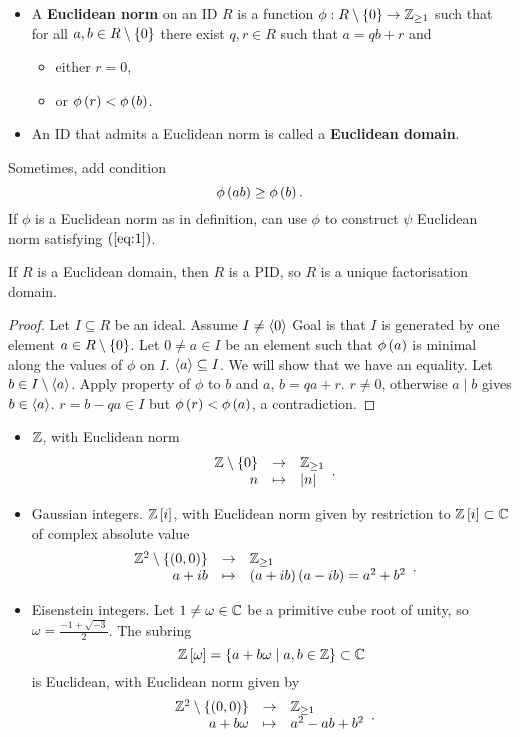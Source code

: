 \begin{definition}
\hfill
\begin{itemize}
\item A \textbf{Euclidean norm} on an ID $ R $ is a function $ \phi : R \setminus \left\{ 0 \right\} \to \mathbb{Z}_{\ge 1} $ such that for all $ a, b \in R \setminus \left\{ 0 \right\} $ there exist $ q, r \in R $ such that $ a = qb + r $ and
\begin{itemize}
\item either $ r = 0 $,
\item or $ \phi\left( r \right) < \phi\left( b \right) $.
\end{itemize}
\item An ID that admits a Euclidean norm is called a \textbf{Euclidean domain}.
\end{itemize}
\end{definition}

Sometimes, add condition
\begin{equation}
\label{eq:1}
\phi\left( ab \right) \ge \phi\left( b \right).
\end{equation}
If $ \phi $ is a Euclidean norm as in definition, can use $ \phi $ to construct $ \psi $ Euclidean norm satisfying $ \left( \ref{eq:1} \right) $.

\begin{theorem}
If $ R $ is a Euclidean domain, then $ R $ is a PID, so $ R $ is a unique factorisation domain.
\end{theorem}


\begin{proof}
Let $ I \subseteq R $ be an ideal. Assume $ I \ne \left\langle 0 \right\rangle $ Goal is that $ I $ is generated by one element $ a \in R \setminus \left\{ 0 \right\} $. Let $ 0 \ne a \in I $ be an element such that $ \phi\left( a \right) $ is minimal along the values of $ \phi $ on $ I $. $ \left\langle a \right\rangle \subseteq I $. We will show that we have an equality. Let $ b \in I \setminus \left\langle a \right\rangle $. Apply property of $ \phi $ to $ b $ and $ a $, $ b = qa + r $. $ r \ne 0 $, otherwise $ a \mid b $ gives $ b \in \left\langle a \right\rangle $. $ r = b - qa \in I $ but $ \phi\left( r \right) < \phi\left( a \right) $, a contradiction.
\end{proof}

\begin{example1}
\hfill
\begin{itemize}
\item $ \mathbb{Z} $, with Euclidean norm
$$ \function{\Z \setminus \cb{0}}{\Z_{\ge 1}}{n}{\abs{n}}. $$
\item Gaussian integers. $ \mathbb{Z}\left[ i \right] $, with Euclidean norm given by restriction to $ \mathbb{Z}\left[ i \right] \subset \mathbb{C} $ of complex absolute value
$$ \function{\Z^2 \setminus \cb{\rb{0, 0}}}{\Z_{\ge 1}}{a + ib}{\rb{a + ib}\rb{a - ib} = a^2 + b^2}. $$
\item Eisenstein integers. Let $ 1 \ne \omega \in \mathbb{C} $ be a primitive cube root of unity, so $ \omega = \tfrac{-1 + \sqrt{-3}}{2} $. The subring
$$ \mathbb{Z}\left[ \omega \right] = \left\{ a + b\omega \mid a, b \in \mathbb{Z} \right\} \subset \mathbb{C} $$
is Euclidean, with Euclidean norm given by
$$ \function{\Z^2 \setminus \cb{\rb{0, 0}}}{\Z_{\ge 1}}{a + b\omega}{a^2 - ab + b^2}. $$
\end{itemize}
\end{example1}

